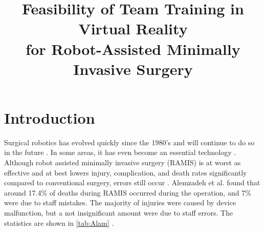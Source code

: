 \documentclass[conference]{IEEEtran}
\begin{document}
\title{Feasibility of Team Training in Virtual Reality \\ for Robot-Assisted Minimally Invasive Surgery}


\author{
}
\maketitle
\thispagestyle{fancy}

\begin{abstract}


\end{abstract}





%
\IEEEpeerreviewmaketitle



\section{Introduction}

Surgical robotics has evolved quickly since the 1980's and will continue to do so in the future \citep{taylor_medical_2008}. In some areas, it has even become an essential technology \citep{sivaraman_robotics_2015}. Although robot assisted minimally invasive surgery (RAMIS) is at worst as effective and at best lowers injury, complication, and death rates significantly compared to conventional surgery, errors still occur \citep{razmaria_does_2014, punnen_how_2013, sung_oncologic_2016,raza_long-term_2015}. Alemzadeh et al. found that around 17.4\% of deaths during RAMIS occurred during the operation, and 7\% were due to staff mistakes. The majority of injuries were caused by device malfunction, but a not insignificant amount were due to staff errors. The statistics are shown in \autoref{tab:Alam} \citep{alemzadeh_adverse_2016}.
\end{document}
